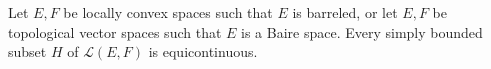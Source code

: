 Let \(E, F\) be locally convex spaces such that \(E\) is barreled, or let \(E, F\) be topological vector spaces such that \(E\) is a Baire space. Every simply bounded subset \(H\) of \(\mathcal{L}(E, F)\) is equicontinuous.